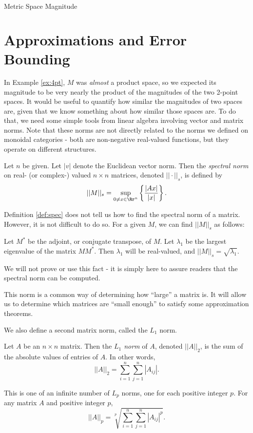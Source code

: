 \documentclass[12pt]{pom_thesis}
\begin{document}
\begin{chapter}{Metric Space Magnitude}
\section{Approximations and Error Bounding}
In Example \ref{ex:4pt}, $M$ was \emph{almost} a product space, so we expected its magnitude to be very nearly the product of the magnitudes of the two 2-point spaces. It would be useful to quantify how similar the magnitudes of two spaces are, given that we know something about how similar those spaces are. To do that, we need some simple tools from linear algebra involving vector and matrix norms. Note that these norms are not directly related to the norms we defined on monoidal categories - both are non-negative real-valued functions, but they operate on different structures.

\begin{defn}\label{def:spec}
Let $n$ be given. Let $|v|$ denote the Euclidean vector norm. Then the \emph{spectral norm} on real- (or complex-) valued $n \times n$ matrices, denoted $||\cdot ||_s$, is defined by
\[
||M||_s = \sup_{0 \neq x \in \Rr^n}\left\{ \frac{|Ax|}{|x|} \right\}.
\]
\end{defn}
\begin{rmk}
Definition \ref{def:spec} does not tell us how to find the spectral norm of a matrix. However, it is not difficult to do so. For a given $M$, we can find $||M||_s$ as follows:

Let $M^*$ be the adjoint, or conjugate transpose, of $M$. Let $\lambda_1$ be the largest eigenvalue of the matrix $MM^*$. Then $\lambda_1$ will be real-valued, and $||M||_s=\sqrt{\lambda_1}$. 

We will not prove or use this fact - it is simply here to assure readers that the spectral norm can be computed.
\end{rmk}
This norm is a common way of determining how ``large'' a matrix is. It will allow us to determine which matrices are ``small enough'' to satisfy some approximation theorems.

We also define a second matrix norm, called the $L_1$ norm.
\begin{defn}
Let $A$ be an $n \times n$ matrix. Then the \emph{$L_1$ norm} of $A$, denoted $||A||_2$, is the sum of the absolute values of entries of $A$. In other words,
\[
||A||_2 = \sum_{i = 1}^n\sum_{j = 1}^n |A_{ij}|.
\]
\end{defn}
\begin{rmk}
This is one of an infinite number of $L_p$ norms, one for each positive integer $p$. For any matrix $A$ and positive integer $p$, 
\[
||A||_p = \sqrt[p]{\sum_{i = 1}^n\sum_{j = 1}^n |A_{ij}|^p}.
\]
\end{rmk}






\end{chapter}
\end{document}
